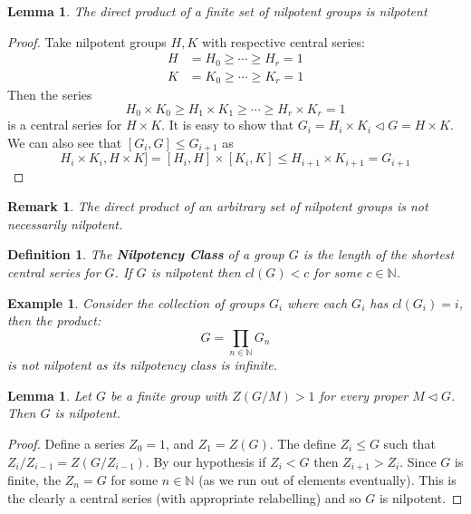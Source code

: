 \documentclass[a4paper,10pt]{article}
\newcommand{\NN}{\mathbb{N}}
\newtheorem{Def}[thm]{Definition}
\newtheorem{eg}[thm]{Example}
\newtheorem{Lem}[thm]{Lemma}
\newtheorem{rem}[thm]{Remark}
\begin{document}
\begin{Lem}
The direct product of a finite set of nilpotent groups is nilpotent
\end{Lem}

\begin{proof}
Take nilpotent groups $H, K$ with respective central series:
\begin{align*}
H &= H_0 \geq \cdots \geq H_r = 1 \\
K &= K_0 \geq \cdots \geq K_r = 1
\end{align*}
Then the series
\[ H_0 \times K_0 \geq H_1 \times K_1 \geq \cdots \geq H_r \times K_r = 1 \]
is a central series for $H \times K$. It is easy to show that $G_i = H_i \times K_i \triangleleft G = H \times K$. We can also see that $[G_i, G] \leq G_{i+1}$ as
\[ H_i \times K_i, H \times K] = [H_i, H] \times [K_i, K] \leq H_{i+1} \times K_{i+1} = G_{i+1} \]
\end{proof}

\begin{rem}
The direct product of an arbitrary set of nilpotent groups is not necessarily nilpotent. 
\end{rem}

\begin{Def}
The \textbf{Nilpotency Class} of a group $G$ is the length of the shortest central series for $G$. If $G$ is nilpotent then $cl(G) < c$ for some $c \in \NN$. 
\end{Def}

\begin{eg}
Consider the collection of groups $G_i$ where each $G_i$ has $cl(G_i) = i$, then the product:
\[ G = \prod_{n \in \NN} G_n \]
is not nilpotent as its nilpotency class is infinite.
\end{eg}

\begin{Lem}
Let $G$ be a finite group with $Z(G / M) > 1$ for every proper $M \triangleleft G$. Then $G$ is nilpotent.
\end{Lem}
\begin{proof}
Define a series $Z_0 = 1$, and $Z_1 = Z(G)$. The define $Z_i \leq G$ such that $Z_i / Z_{i-1} = Z(G / Z_{i-1})$. By our hypothesis if $Z_i < G$ then $Z_{i+1} > Z_i$. Since $G$ is finite, the $Z_n = G$ for some $n \in \NN$ (as we run out of elements eventually). This is the clearly a central series (with appropriate relabelling) and so $G$ is nilpotent. 
\end{proof}
\end{document}
